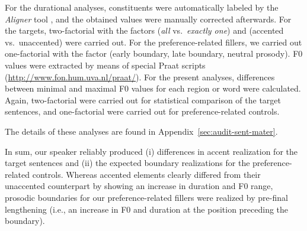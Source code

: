 \documentclass[fleqn,reqno,10pt,draft]{article}
\begin{document}
For the durational analyses, constituents were automatically labeled
by the \emph{Aligner} tool \citep{Rapp98}, and the
obtained values were manually corrected afterwards. For the targets,
two-factorial  with the factors  (\emph{all}
vs.~\emph{exactly one}) and  (accented vs.~unaccented) were
carried out. For the preference-related fillers, we carried out
one-factorial  with the factor  (early
boundary, late boundary, neutral prosody). F0 values were extracted by
means of special Praat scripts
(\url{http://www.fon.hum.uva.nl/praat/}). For the present analyses,
differences between minimal and maximal F0 values for each region or
word were calculated. Again, two-factorial  were carried
out for statistical comparison of the target sentences, and one-factorial
 were carried out for preference-related controls.

The details of these analyses are found in
Appendix~\ref{sec:audit-sent-mater}.  

In sum, our speaker reliably
produced (i) differences in accent realization for the target
sentences and (ii) the expected boundary realizations for the
preference-related controls. Whereas accented elements clearly
differed from their unaccented counterpart by showing an increase in
duration and F0 range, prosodic boundaries for our preference-related
fillers were realized by pre-final lengthening (i.e., an increase in F0
and duration at the position preceding the boundary).
\end{document}
